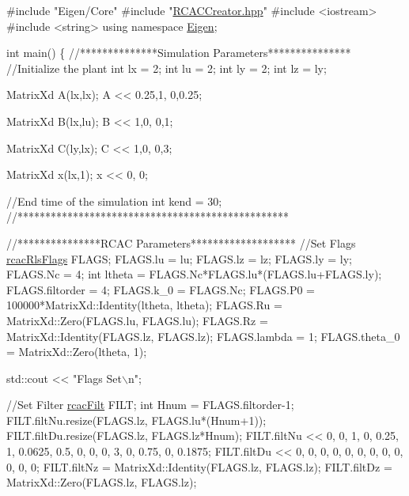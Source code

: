 \begin{DoxyCode}
\textcolor{preprocessor}{#include "Eigen/Core"}
\textcolor{preprocessor}{#include "\hyperlink{_r_c_a_c_creator_8hpp}{RCACCreator.hpp}"}
\textcolor{preprocessor}{#include <iostream>}
\textcolor{preprocessor}{#include <string>}
\textcolor{keyword}{using namespace }\hyperlink{namespace_eigen}{Eigen};

\textcolor{keywordtype}{int} main()
\{
    \textcolor{comment}{//**************Simulation Parameters***************}
    \textcolor{comment}{//Initialize the plant}
    \textcolor{keywordtype}{int} lx = 2;
    \textcolor{keywordtype}{int} lu = 2;
    \textcolor{keywordtype}{int} ly = 2;
    \textcolor{keywordtype}{int} lz = ly;

    MatrixXd A(lx,lx);
    A << 0.25,1,
          0,0.25;

    MatrixXd B(lx,lu);
    B << 1,0,
         0,1;

    MatrixXd C(ly,lx);
    C << 1,0,
         0,3;

    MatrixXd x(lx,1);
    x << 0,
         0;

    \textcolor{comment}{//End time of the simulation}
    \textcolor{keywordtype}{int} kend = 30;
    \textcolor{comment}{//*************************************************}


    \textcolor{comment}{//***************RCAC Parameters*******************}
    \textcolor{comment}{//Set Flags}
    \hyperlink{structrcac_rls_flags}{rcacRlsFlags} FLAGS;
    FLAGS.lu = lu;
    FLAGS.lz = lz;
    FLAGS.ly = ly;
    FLAGS.Nc = 4;
    \textcolor{keywordtype}{int} ltheta = FLAGS.Nc*FLAGS.lu*(FLAGS.lu+FLAGS.ly);
    FLAGS.filtorder = 4;
    FLAGS.k\_0 = FLAGS.Nc;
    FLAGS.P0 = 100000*MatrixXd::Identity(ltheta, ltheta);
    FLAGS.Ru = MatrixXd::Zero(FLAGS.lu, FLAGS.lu);
    FLAGS.Rz = MatrixXd::Identity(FLAGS.lz, FLAGS.lz);
    FLAGS.lambda = 1;
    FLAGS.theta\_0 = MatrixXd::Zero(ltheta, 1);

    std::cout << \textcolor{stringliteral}{"Flags Set\(\backslash\)n"}; 

    \textcolor{comment}{//Set Filter}
    \hyperlink{structrcac_filt}{rcacFilt} FILT;
    \textcolor{keywordtype}{int} Hnum = FLAGS.filtorder-1;
    FILT.filtNu.resize(FLAGS.lz, FLAGS.lu*(Hnum+1));
    FILT.filtDu.resize(FLAGS.lz, FLAGS.lz*Hnum);
    FILT.filtNu << 0, 0, 1, 0, 0.25, 1, 0.0625, 0.5,
                   0, 0, 0, 3, 0, 0.75, 0, 0.1875; 
    FILT.filtDu << 0, 0, 0, 0, 0, 0,
                   0, 0, 0, 0, 0, 0;
    FILT.filtNz = MatrixXd::Identity(FLAGS.lz, FLAGS.lz);
    FILT.filtDz =  MatrixXd::Zero(FLAGS.lz, FLAGS.lz);


\end{DoxyCode}
